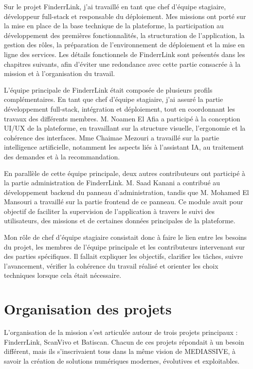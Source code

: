 Sur le projet FinderrLink, j'ai travaillé en tant que chef d'équipe stagiaire, développeur full-stack et responsable du déploiement. Mes missions ont porté sur la mise en place de la base technique de la plateforme, la participation au développement des premières fonctionnalités, la structuration de l'application, la gestion des rôles, la préparation de l'environnement de déploiement et la mise en ligne des services. Les détails fonctionnels de FinderrLink sont présentés dans les chapitres suivants, afin d'éviter une redondance avec cette partie consacrée à la mission et à l'organisation du travail.

L'équipe principale de FinderrLink était composée de plusieurs profils complémentaires. En tant que chef d'équipe stagiaire, j'ai assuré la partie développement full-stack, intégration et déploiement, tout en coordonnant les travaux des différents membres. M. Noamen El Afia a participé à la conception UI/UX de la plateforme, en travaillant sur la structure visuelle, l'ergonomie et la cohérence des interfaces. Mme Chaimae Mezouri a travaillé sur la partie intelligence artificielle, notamment les aspects liés à l'assistant IA, au traitement des demandes et à la recommandation.

En parallèle de cette équipe principale, deux autres contributeurs ont participé à la partie administration de FinderrLink. M. Saad Kanani a contribué au développement backend du panneau d'administration, tandis que M. Mohamed El Mansouri a travaillé sur la partie frontend de ce panneau. Ce module avait pour objectif de faciliter la supervision de l'application à travers le suivi des utilisateurs, des missions et de certaines données principales de la plateforme.

Mon rôle de chef d'équipe stagiaire consistait donc à faire le lien entre les besoins du projet, les membres de l'équipe principale et les contributeurs intervenant sur des parties spécifiques. Il fallait expliquer les objectifs, clarifier les tâches, suivre l'avancement, vérifier la cohérence du travail réalisé et orienter les choix techniques lorsque cela était nécessaire.

\section{Organisation des projets}

L'organisation de la mission s'est articulée autour de trois projets principaux : FinderrLink, ScanVivo et Batiscan. Chacun de ces projets répondait à un besoin différent, mais ils s'inscrivaient tous dans la même vision de MEDIASSIVE, à savoir la création de solutions numériques modernes, évolutives et exploitables.

